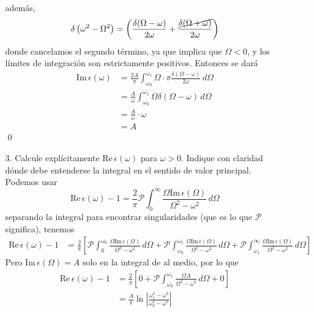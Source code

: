 \documentclass[]{article}
\numberwithin{equation}{section}
\begin{document}
\begin{enumerate}
\begin{enumerate}
\begin{equation}
		\end{equation}
		además,
		\begin{equation}
			\delta\left(\omega^2 - \Omega^2\right) = \left(\frac{\delta(\Omega -\omega)}{2\omega} + \frac{\cancel{\delta(\Omega + \omega)}}{2\omega}\right)
		\end{equation}
		donde cancelamos el segundo término, ya que implica que $\Omega < 0$, y los límites de integración son estrictamente positivos. Entonces se dará
		\begin{align*}
			\mathrm{Im} \, \epsilon(\omega) &= \frac{2 A}{\pi} \int_{\omega_0}^{\omega_1} \Omega \cdot \pi \frac{\delta(\Omega -\omega)}{2\omega} \, d\Omega\\
			&= \frac{A}{\omega} \int_{\omega_0}^{\omega_1} \Omega \delta(\Omega -\omega) \, d\Omega\\
			&= \frac{A}{\omega} \cdot \omega\\
			&= A
		\end{align*}
		\qed
		
		\item[3.] Calcule explícitamente $\mathrm{Re} \, \epsilon(\omega)$ para $\omega > 0$. Indique con claridad dónde debe entenderse la integral en el sentido de valor principal.
		\resp Podemos usar 
		\begin{equation*}
			\mathrm{Re} \, \epsilon(\omega) - 1 = \frac{2}{\pi} \mathcal{P} \int_{0}^{\infty} \frac{\Omega \mathrm{Im}\, \epsilon(\Omega)}{\Omega^2 - \omega^2} \, d\Omega
		\end{equation*}
		separando la integral para encontrar singularidades (que es lo que $\mathcal{P}$ significa), tenemos
		\begin{align*}
			\mathrm{Re} \, \epsilon(\omega) - 1 &= \frac{2}{\pi} \left[\mathcal{P} \int_{0}^{\omega_0} \frac{\Omega \mathrm{Im}\, \epsilon(\Omega)}{\Omega^2 - \omega^2} \, d\Omega + \mathcal{P} \int_{\omega_0}^{\omega_1} \frac{\Omega \mathrm{Im}\, \epsilon(\Omega)}{\Omega^2 - \omega^2} \, d\Omega + \mathcal{P} \int_{\omega_1}^{\infty} \frac{\Omega \mathrm{Im}\, \epsilon(\Omega)}{\Omega^2 - \omega^2} \, d\Omega\right]
		\end{align*}
		Pero $\mathrm{Im}\, \epsilon(\Omega) = A$ solo en la integral de al medio, por lo que
		\begin{align*}
			\mathrm{Re} \, \epsilon(\omega) - 1 &= \frac{2}{\pi} \left[0 + \mathcal{P} \int_{\omega_0}^{\omega_1} \frac{\Omega A}{\Omega^2 - \omega^2} \, d\Omega + 0\right]\\
			&= \frac{A}{\pi} \ln\left|\frac{\omega_1^2 - \omega^2}{\omega_0^2 - \omega^2}\right|
		\end{align*}
		

\end{enumerate}
\end{enumerate}
\end{document}

